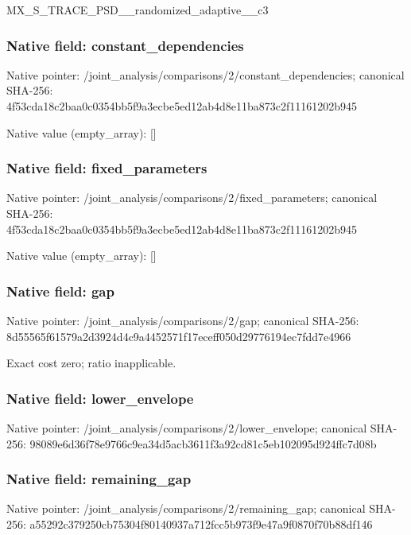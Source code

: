 \documentclass[10pt,a4paper]{article}
\begin{document}
\begingroup\raggedright\sloppy MX\_\allowbreak{}S\_\allowbreak{}TRACE\_\allowbreak{}PSD\_\allowbreak{}\_\allowbreak{}randomized\_\allowbreak{}adaptive\_\allowbreak{}\_\allowbreak{}c3\par\endgroup

\subsubsection{Native field: constant\_\allowbreak{}dependencies}
Native pointer: /joint\_\allowbreak{}analysis/comparisons/2/constant\_\allowbreak{}dependencies; canonical SHA-256: 4f53cda18c2baa0c0354bb5f9a3ecbe5ed12ab4d8e11ba873c2f11161202b945

Native value (empty\_\allowbreak{}array): []

\subsubsection{Native field: fixed\_\allowbreak{}parameters}
Native pointer: /joint\_\allowbreak{}analysis/comparisons/2/fixed\_\allowbreak{}parameters; canonical SHA-256: 4f53cda18c2baa0c0354bb5f9a3ecbe5ed12ab4d8e11ba873c2f11161202b945

Native value (empty\_\allowbreak{}array): []

\subsubsection{Native field: gap}
Native pointer: /joint\_\allowbreak{}analysis/comparisons/2/gap; canonical SHA-256: 8d55565f61579a2d3924d4c9a4452571f17eceff050d29776194ec7fdd7e4966

\begingroup\raggedright\sloppy Exact cost zero;\allowbreak{} ratio inapplicable.\par\endgroup

\subsubsection{Native field: lower\_\allowbreak{}envelope}
Native pointer: /joint\_\allowbreak{}analysis/comparisons/2/lower\_\allowbreak{}envelope; canonical SHA-256: 98089e6d36f78e9766c9ea34d5acb3611f3a92cd81c5eb102095d924ffc7d08b

\begingroup\raggedright{}\par\endgroup

\subsubsection{Native field: remaining\_\allowbreak{}gap}
Native pointer: /joint\_\allowbreak{}analysis/comparisons/2/remaining\_\allowbreak{}gap; canonical SHA-256: a55292c379250cb75304f80140937a712fcc5b973f9e47a9f0870f70b88df146
\end{document}
